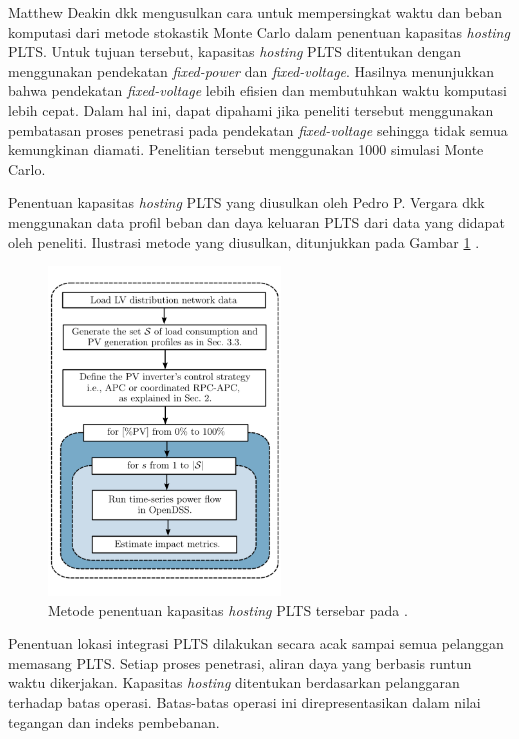 {{{Matthew Deakin dkk mengusulkan cara untuk mempersingkat waktu dan beban komputasi dari metode stokastik Monte Carlo dalam penentuan kapasitas \textit{hosting} PLTS. Untuk tujuan tersebut, kapasitas \textit{hosting} PLTS ditentukan dengan menggunakan pendekatan \textit{fixed-power} dan \textit{fixed-voltage}. Hasilnya menunjukkan bahwa pendekatan \textit{fixed-voltage} lebih efisien dan membutuhkan waktu komputasi lebih cepat. Dalam hal ini, dapat dipahami jika peneliti tersebut menggunakan pembatasan proses penetrasi pada pendekatan \textit{fixed-voltage} sehingga tidak semua kemungkinan diamati. Penelitian tersebut menggunakan 1000 simulasi Monte Carlo. 

Penentuan kapasitas \textit{hosting} PLTS yang diusulkan oleh Pedro P. Vergara dkk \cite{Vergara2020} menggunakan data profil beban dan daya keluaran PLTS dari data yang didapat oleh peneliti. Ilustrasi metode yang diusulkan, ditunjukkan pada Gambar \ref{methodvergara} \cite{Vergara2020}.
\begin{figure}[!h]
	\centering
	\includegraphics[width=0.55\textwidth]{Fig/methodvergara}
	\caption{Metode penentuan kapasitas \textit{hosting} PLTS tersebar pada \cite{Vergara2020}.}
	\label{methodvergara}
\end{figure}
Penentuan lokasi integrasi PLTS dilakukan secara acak sampai semua pelanggan memasang PLTS. Setiap proses penetrasi, aliran daya yang berbasis runtun waktu dikerjakan. Kapasitas \textit{hosting} ditentukan berdasarkan pelanggaran terhadap batas operasi. Batas-batas operasi ini direpresentasikan dalam nilai tegangan dan indeks pembebanan. 

}}}

